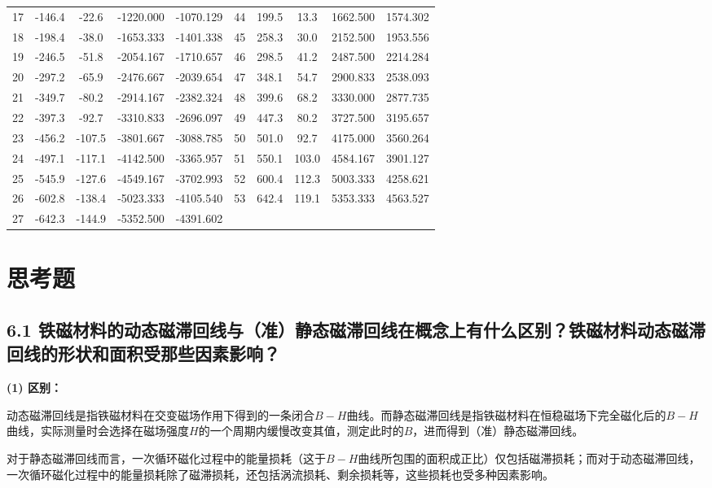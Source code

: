 \documentclass[UTF8]{article}
\theoremstyle{MyLineTheoremStyle} %
\theoremstyle{MyBlockTheoremStyle} %
\theoremstyle{MySubsubsectionStyle} %
\begin{document}
\begin{table}[H]
{\begin{tabular}{|c|cccc|c|cccc|}
    17	&-146.4	&-22.6	&-1220.000	&-1070.129	&44	&199.5	&13.3	&1662.500	&1574.302  \\
    18	&-198.4	&-38.0	&-1653.333	&-1401.338	&45	&258.3	&30.0	&2152.500	&1953.556  \\
    19	&-246.5	&-51.8	&-2054.167	&-1710.657	&46	&298.5	&41.2	&2487.500	&2214.284  \\
    20	&-297.2	&-65.9	&-2476.667	&-2039.654	&47	&348.1	&54.7	&2900.833	&2538.093  \\
    21	&-349.7	&-80.2	&-2914.167	&-2382.324	&48	&399.6	&68.2	&3330.000	&2877.735  \\
    22	&-397.3	&-92.7	&-3310.833	&-2696.097	&49	&447.3	&80.2	&3727.500	&3195.657  \\
    23	&-456.2	&-107.5	&-3801.667	&-3088.785	&50	&501.0	&92.7	&4175.000	&3560.264  \\
    24	&-497.1	&-117.1	&-4142.500	&-3365.957	&51	&550.1	&103.0	&4584.167	&3901.127  \\
    25	&-545.9	&-127.6	&-4549.167	&-3702.993	&52	&600.4	&112.3	&5003.333	&4258.621  \\
    26	&-602.8	&-138.4	&-5023.333	&-4105.540	&53	&642.4	&119.1	&5353.333	&4563.527  \\
    27	&-642.3	&-144.9	&-5352.500	&-4391.602	&	&		&	& & \\
    \hline
\end{tabular}}
\end{table}

\section{思考题}

\subsection*{6.1 铁磁材料的动态磁滞回线与（准）静态磁滞回线在概念上有什么区别？铁磁材料动态磁滞回线的形状和面积受那些因素影响？}


\noindent \textbf{(1) 区别：}

动态磁滞回线是指铁磁材料在交变磁场作用下得到的一条闭合$ B-H $曲线。而静态磁滞回线是指铁磁材料在恒稳磁场下完全磁化后的$ B-H $曲线，实际测量时会选择在磁场强度$ H $的一个周期内缓慢改变其值，测定此时的$ B $，进而得到（准）静态磁滞回线。

对于静态磁滞回线而言，一次循环磁化过程中的能量损耗（这于$ B-H $曲线所包围的面积成正比）仅包括磁滞损耗；而对于动态磁滞回线，一次循环磁化过程中的能量损耗除了磁滞损耗，还包括涡流损耗、剩余损耗等，这些损耗也受多种因素影响。
\end{document}
